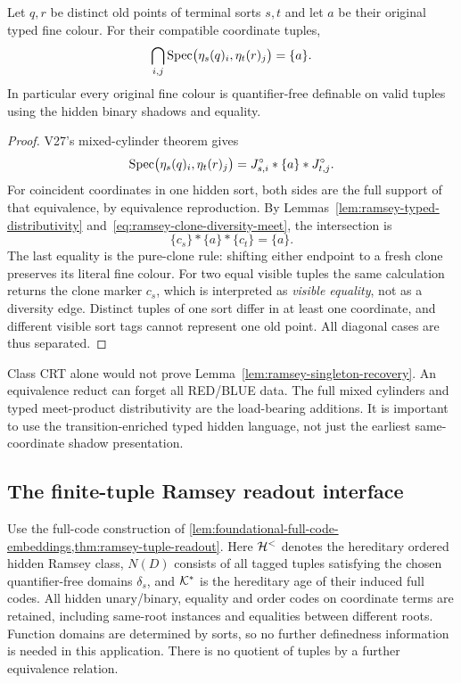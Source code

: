 \begin{lemma}\label{lem:ramsey-singleton-recovery}
Let $q,r$ be distinct old points of terminal sorts $s,t$ and let $a$ be their
original typed fine colour. For their compatible coordinate tuples,
\begin{equation}\label{eq:ramsey-singleton}
 \bigcap_{i,j}\operatorname{Spec}\bigl(\eta_s(q)_i,\eta_t(r)_j\bigr)=\{a\}.
\end{equation}
In particular every original fine colour is quantifier-free definable on
valid tuples using the hidden binary shadows and equality.
\end{lemma}
\begin{proof}
V27's mixed-cylinder theorem gives
\[
 \operatorname{Spec}\bigl(\eta_s(q)_i,\eta_t(r)_j\bigr)
       =J_{s,i}^\circ*\{a\}*J_{t,j}^\circ.
\]
For coincident coordinates in one hidden sort, both sides are the full
support of that equivalence, by equivalence reproduction. By
Lemmas~\ref{lem:ramsey-typed-distributivity} and~\eqref{eq:ramsey-clone-diversity-meet}, the intersection is
\[
     \{c_s\}*\{a\}*\{c_t\}=\{a\}.
\]
The last equality is the pure-clone rule: shifting either endpoint to a
fresh clone preserves its literal fine colour. For two equal visible tuples
the same calculation returns the clone marker $c_s$, which is interpreted as
\emph{visible equality}, not as a diversity edge. Distinct tuples of one
sort differ in at least one coordinate, and different visible sort tags
cannot represent one old point. All diagonal cases are thus separated.
\end{proof}

\begin{remark}
Class CRT alone would not prove Lemma~\ref{lem:ramsey-singleton-recovery}. An equivalence reduct
can forget all RED/BLUE data. The full mixed cylinders and typed
meet-product distributivity are the load-bearing additions. It is important
to use the transition-enriched typed hidden language, not just the earliest
same-coordinate shadow presentation.
\end{remark}

\subsection{The finite-tuple Ramsey readout interface}

Use the full-code construction of
\cref{lem:foundational-full-code-embeddings,thm:ramsey-tuple-readout}.
Here $\mathcal{H}^{<}$ denotes the hereditary ordered hidden Ramsey class,
$N(D)$ consists of all tagged tuples satisfying the chosen quantifier-free
domains $\delta_s$, and $\mathcal{K}^{*}$ is the hereditary age of their induced full
codes. All hidden unary/binary, equality and order codes on coordinate
terms are retained, including same-root instances and equalities between
different roots. Function domains are determined by sorts, so no further
definedness information is needed in this application. There is no
quotient of tuples by a further equivalence relation.

